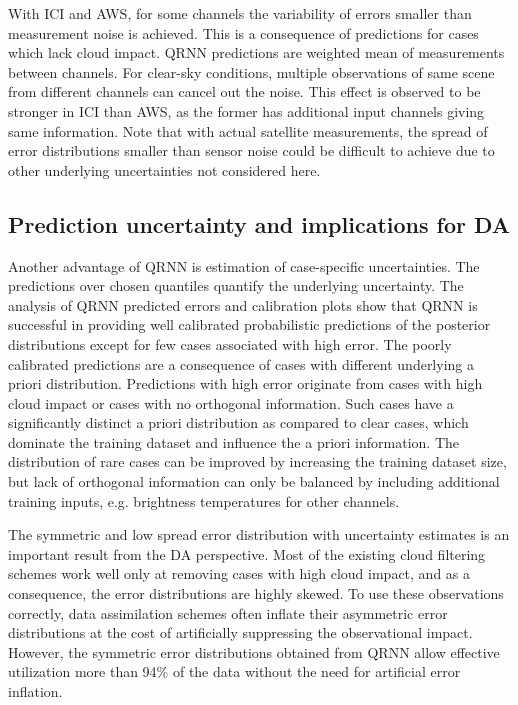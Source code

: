 \documentclass[amt, manuscript]{copernicus}
\begin{document}
With ICI and AWS, for some channels the variability of errors smaller than measurement noise is achieved. This is a consequence of predictions for cases which lack cloud impact. QRNN predictions are weighted mean of measurements between channels. For clear-sky conditions, multiple observations of same scene from different channels can cancel out the noise. This effect is observed to be stronger in ICI than AWS, as the former has additional input channels giving same information. Note that with actual satellite measurements, the spread of error distributions smaller than sensor noise could be difficult to achieve due to other underlying uncertainties not considered here. 
 


\subsection{Prediction uncertainty and implications for DA}

Another advantage of QRNN is estimation of case-specific uncertainties. The predictions over chosen quantiles quantify the underlying uncertainty. The analysis of QRNN predicted errors and calibration plots show that QRNN is successful in providing well calibrated probabilistic predictions of the posterior distributions except for few cases associated with high error. The poorly calibrated predictions are a consequence of cases with different underlying a priori distribution. Predictions with high error originate from cases with high cloud impact or cases with no orthogonal information. Such cases have a significantly distinct a priori distribution as compared to clear cases, which dominate the training dataset and influence the a priori information. The distribution of rare cases can be improved by increasing the training dataset size, but lack of orthogonal information can only be balanced by including additional training inputs, e.g. brightness temperatures for other channels. 

The symmetric and low spread error distribution with uncertainty estimates is an important result from the DA perspective. Most of the existing cloud filtering schemes work well only at removing cases with high cloud impact, and as a consequence, the error distributions are highly skewed. To use these observations correctly, data assimilation schemes often inflate their asymmetric error distributions at the cost of artificially suppressing the observational impact. However, the symmetric error distributions obtained from QRNN allow effective utilization more than 94\% of the data without the need for artificial error inflation. 
\end{document}
